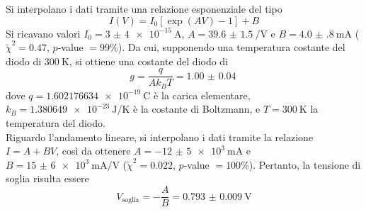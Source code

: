 \documentclass[a4paper]{article}
\begin{document}
Si interpolano i dati tramite una relazione esponenziale del tipo
\[
I(V)=I_0 \left[ \exp\left( A V \right) -1 \right] + B
\] 
Si ricavano valori $I_0=\SI{3(4)e-15}{\A}$, $A=\SI{39.6(15)}{\per\volt}$ e $B=\SI{4.0(8)}{\mA}$ ($\widetilde{\chi}^2=0.47$, $p$-value $=99\%$). Da cui, supponendo una temperatura costante del diodo di $\SI{300}{\K}$, si ottiene una costante del diodo di
\[
g=\frac{q}{Ak_BT}=\SI{1.00(4)}{}
\] 
dove $q=\SI{1.602176634e-19}{\coulomb}$ è la carica elementare, $k_B=\SI{1.380649e-23}{\J\per\K}$ è la costante di Boltzmann, e $T=\SI{300}{\K}$ la temperatura del diodo.\\
Riguardo l'andamento lineare, si interpolano i dati tramite la relazione $I=A+BV$, così da ottenere $A=\SI{-12(5)e+3}{\mA}$ e $B=\SI{15(6)e+3}{\mA\per\V}$ ($\widetilde{\chi}^2=0.022$, $p$-value $=100\%$). Pertanto, la tensione di soglia risulta essere
\[
V_\text{soglia} = -\frac{A}{B}=\SI{0.793(9)}{\V}
\] 
\end{document}
